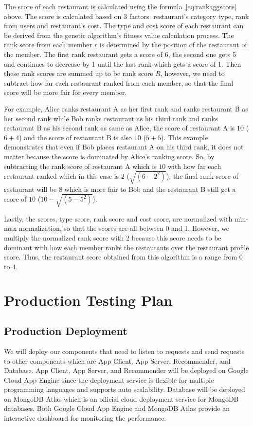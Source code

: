 \documentclass[12pt,oneside,openright,a4paper]{cpe-english-project}
\begin{document}
The score of each restaurant is calculated using the formula~\ref{eq:rankaggscore} above. The score is calculated based on 3 factors: restaurant’s category type, rank from users and restaurant’s cost. The type and cost score of each restaurant can be derived from the genetic algorithm’s fitness value calculation process. The rank score from each member $r$ is determined by the position of the restaurant of the member. The first rank restaurant gets a score of 6, the second one gets 5 and continues to decrease by 1 until the last rank which gets a score of 1. Then these rank scores are summed up to be rank score $R$, however, we need to subtract how far each restaurant ranked from each member, so that the final score will be more fair for every member.

For example, Alice ranks restaurant A as her first rank and ranks restaurant B as her second rank while Bob ranks restaurant as his third rank and ranks restaurant B as his second rank as same as Alice, the score of restaurant A is $10$ ($6 + 4$) and the score of restaurant B is also $10$ ($5 + 5$). This example demonstrates that even if Bob places restaurant A on his third rank, it does not matter because the score is dominated by Alice's ranking score. So, by subtracting the rank score of restaurant A which is $10$ with how far each restaurant ranked which in this case is $2$ ($\sqrt{(6-2^2)}$), the final rank score of restaurant will be 8 which is more fair to Bob and the restaurant B still get a score of $10$ ($10-\sqrt{(5-5^2)}$).

Lastly, the scores, type score, rank score and cost score, are normalized with min-max normalization, so that the scores are all between 0 and 1. However, we multiply the normalized rank score with 2 because this score needs to be dominant with how each member ranks the restaurants over the restaurant profile score. Thus, the restaurant score obtained from this algorithm is a range from 0 to 4.

\section{Production Testing Plan}

\subsection{Production Deployment}

We will deploy our components that need to listen to requests and send requests to other components which are App Client, App Server, Recommender, and Database. App Client, App Server, and Recommender will be deployed on Google Cloud App Engine since the deployment service is flexible for multiple programming languages and supports auto scalability. Database will be deployed on MongoDB Atlas which is an official cloud deployment service for MongoDB databases. Both Google Cloud App Engine and MongoDB Atlas provide an interactive dashboard for monitoring the performance.
\end{document}
